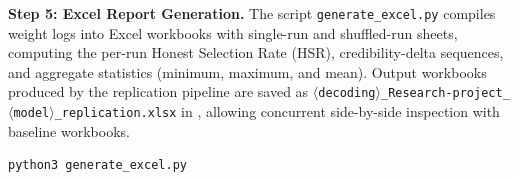 \smallskip\noindent\textbf{Step 5: Excel Report Generation.} The script \texttt{generate\_excel.py} compiles weight logs into Excel workbooks with single-run and shuffled-run sheets, computing the per-run Honest Selection Rate (HSR), credibility-delta sequences, and aggregate statistics (minimum, maximum, and mean). Output workbooks produced by the replication pipeline are saved as \texttt{$\langle$decoding$\rangle$\_Research-project\_$\langle$model$\rangle$\_replication.xlsx} in , allowing concurrent side-by-side inspection with baseline workbooks.

\begin{lstlisting}[style=shell]
python3 generate_excel.py
\end{lstlisting}
